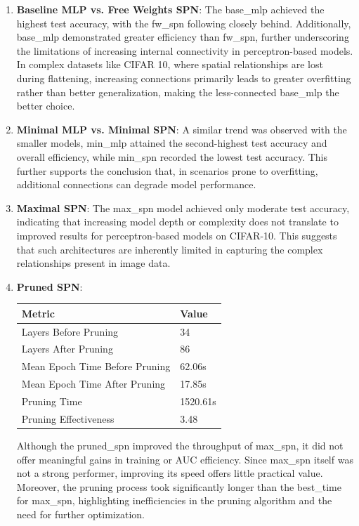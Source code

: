 \begin{enumerate}
\item \textbf{Baseline MLP vs. Free Weights SPN}: The base\_mlp achieved the highest test accuracy, with the fw\_spn following closely behind. Additionally, base\_mlp demonstrated greater efficiency than fw\_spn, further underscoring the limitations of increasing internal connectivity in perceptron-based models. In complex datasets like CIFAR 10, where spatial relationships are lost during flattening, increasing connections primarily leads to greater overfitting rather than better generalization, making the less-connected base\_mlp the better choice.
\item \textbf{Minimal MLP vs. Minimal SPN}: A similar trend was observed with the smaller models, min\_mlp attained the second-highest test accuracy and overall efficiency, while min\_spn recorded the lowest test accuracy. This further supports the conclusion that, in scenarios prone to overfitting, additional connections can degrade model performance.
\item \textbf{Maximal SPN}: The max\_spn model achieved only moderate test accuracy, indicating that increasing model depth or complexity does not translate to improved results for perceptron-based models on CIFAR-10. This suggests that such architectures are inherently limited in capturing the complex relationships present in image data.
\item \textbf{Pruned SPN}:
\begin{center}  %
\begin{tabular}{|l|l|}
\hline
\textbf{Metric} & \textbf{Value} \\
\hline
Layers Before Pruning & 34 \\
Layers After Pruning & 86 \\
Mean Epoch Time Before Pruning & 62.06s \\
Mean Epoch Time After Pruning & 17.85s \\
Pruning Time & 1520.61s \\
Pruning Effectiveness & 3.48 \\
\hline
\end{tabular}
\end{center}

Although the pruned\_spn improved the throughput of max\_spn, it did not offer meaningful gains in training or AUC efficiency. Since max\_spn itself was not a strong performer, improving its speed offers little practical value. Moreover, the pruning process took significantly longer than the best\_time for max\_spn, highlighting inefficiencies in the pruning algorithm and the need for further optimization.

\end{enumerate}


